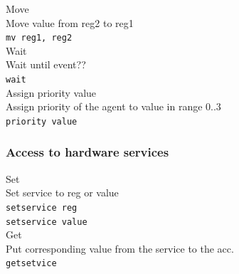 \documentclass{scrreprt}
\begin{document}
\noindent
Move\\
\noindent
Move value from reg2 to reg1\\
\noindent
\texttt{mv reg1, reg2}\\

\noindent
Wait\\
\noindent
Wait until event??\\
\noindent
\texttt{wait }\\

\noindent
Assign priority value\\
\noindent
Assign priority of the agent to value in range 0..3\\
\noindent
\texttt{priority value}\\

\subsubsection{Access to hardware services}
\noindent
Set\\
\noindent
Set service to reg or value\\
\noindent
\texttt{setservice reg}\\
\texttt{setservice value}\\

\noindent
Get\\
\noindent
Put corresponding value from the service to the acc.\\
\noindent
\texttt{getsetvice }\\
\end{document}

